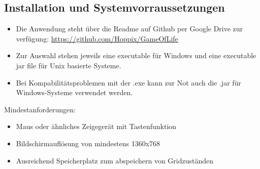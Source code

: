 \documentclass[12pt]{article}
\theoremstyle{plain}
\begin{document}
\subsection{Installation und Systemvorraussetzungen}
\begin{itemize}
\item Die Anwendung steht über die Readme auf Github per Google Drive zur verfügung: \url{https://github.com/Hoppix/GameOfLife}
\item Zur Auswahl stehen jeweils eine executable für Windows und eine executable jar file für Unix basierte Systeme.
\item Bei Kompabilitätsproblemen mit der .exe kann zur Not auch die .jar für Windows-Systeme verwendet werden.
\end{itemize}
Mindestanforderungen:
\begin{itemize}
\item Maus oder ähnliches Zeigegerät mit Tastenfunktion
\item Bildschirmauflösung von mindestens 1360x768
\item Ausreichend Speicherplatz zum abspeichern von Gridzuständen
\end{itemize}
\end{document}
